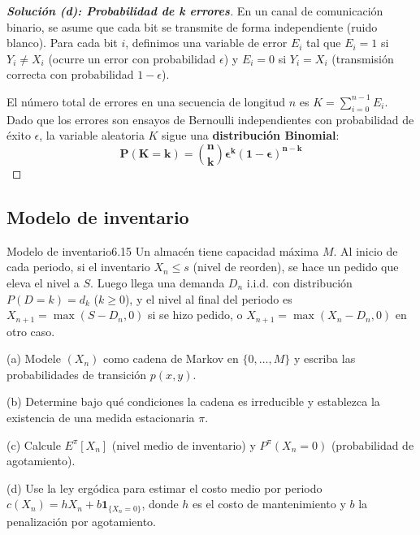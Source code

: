 \documentclass[10pt,a4paper]{article}
\begin{document}
\begin{proof}[\textbf{Solución (d): Probabilidad de k errores}]
    En un canal de comunicación binario, se asume que cada bit se transmite de forma independiente (ruido blanco). 
    Para cada bit $i$, definimos una variable de error $E_i$ tal que $E_i = 1$ si $Y_i \neq X_i$ (ocurre un error con probabilidad $\epsilon$) y $E_i = 0$ si $Y_i = X_i$ (transmisión correcta con probabilidad $1-\epsilon$).
    
    El número total de errores en una secuencia de longitud $n$ es $K = \sum_{i=0}^{n-1} E_i$.
    Dado que los errores son ensayos de Bernoulli independientes con probabilidad de éxito $\epsilon$, la variable aleatoria $K$ sigue una \textbf{distribución Binomial}:
    \[ \mathbf{P(K = k) = \binom{n}{k} \epsilon^k (1-\epsilon)^{n-k}} \]
\end{proof}



\newpage

\subsection{Modelo de inventario}

\begin{ejercicio}{Modelo de inventario}{6.15}
    Un almacén tiene capacidad máxima $M$. Al inicio de cada periodo, si el inventario $X_n \le s$ (nivel de reorden), se hace un pedido que eleva el nivel a $S$. Luego llega una demanda $D_n$ i.i.d. con distribución $P(D = k) = d_k$ ($k \ge 0$), y el nivel al final del periodo es $X_{n+1} = \max(S - D_n, 0)$ si se hizo pedido, o $X_{n+1} = \max(X_n - D_n, 0)$ en otro caso.
    
    (a) Modele $(X_n)$ como cadena de Markov en $\{0, \dots, M\}$ y escriba las probabilidades de transición $p(x, y)$.
    
    (b) Determine bajo qué condiciones la cadena es irreducible y establezca la existencia de una medida estacionaria $\pi$.
    
    (c) Calcule $E^\pi[X_n]$ (nivel medio de inventario) y $P^\pi(X_n = 0)$ (probabilidad de agotamiento).
    
    (d) Use la ley ergódica para estimar el costo medio por periodo $c(X_n) = h X_n + b \mathbf{1}_{\{X_n=0\}}$, donde $h$ es el costo de mantenimiento y $b$ la penalización por agotamiento.
\end{ejercicio}

\vspace{2mm}
\end{document}
